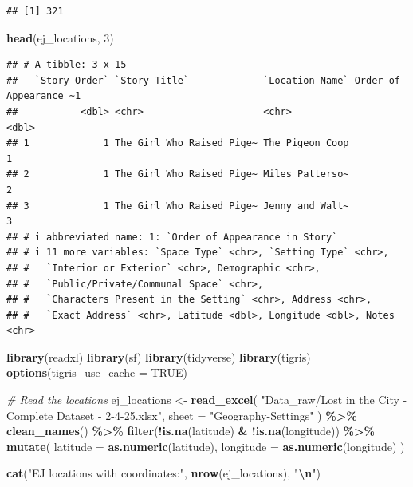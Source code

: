 \documentclass[
]{article}
\newenvironment{Shaded}{\begin{snugshade}}{\end{snugshade}}
\newcommand{\AttributeTok}[1]{\textcolor[rgb]{0.13,0.29,0.53}{#1}}
\newcommand{\CommentTok}[1]{\textcolor[rgb]{0.56,0.35,0.01}{\textit{#1}}}
\newcommand{\ConstantTok}[1]{\textcolor[rgb]{0.56,0.35,0.01}{#1}}
\newcommand{\DecValTok}[1]{\textcolor[rgb]{0.00,0.00,0.81}{#1}}
\newcommand{\FunctionTok}[1]{\textcolor[rgb]{0.13,0.29,0.53}{\textbf{#1}}}
\newcommand{\NormalTok}[1]{#1}
\newcommand{\OtherTok}[1]{\textcolor[rgb]{0.56,0.35,0.01}{#1}}
\newcommand{\SpecialCharTok}[1]{\textcolor[rgb]{0.81,0.36,0.00}{\textbf{#1}}}
\newcommand{\StringTok}[1]{\textcolor[rgb]{0.31,0.60,0.02}{#1}}
\begin{document}
\begin{verbatim}
## [1] 321
\end{verbatim}

\begin{Shaded}
\begin{Highlighting}[]
\FunctionTok{head}\NormalTok{(ej\_locations, }\DecValTok{3}\NormalTok{)}
\end{Highlighting}
\end{Shaded}

\begin{verbatim}
## # A tibble: 3 x 15
##   `Story Order` `Story Title`             `Location Name` Order of Appearance ~1
##           <dbl> <chr>                     <chr>                            <dbl>
## 1             1 The Girl Who Raised Pige~ The Pigeon Coop                      1
## 2             1 The Girl Who Raised Pige~ Miles Patterso~                      2
## 3             1 The Girl Who Raised Pige~ Jenny and Walt~                      3
## # i abbreviated name: 1: `Order of Appearance in Story`
## # i 11 more variables: `Space Type` <chr>, `Setting Type` <chr>,
## #   `Interior or Exterior` <chr>, Demographic <chr>,
## #   `Public/Private/Communal Space` <chr>,
## #   `Characters Present in the Setting` <chr>, Address <chr>,
## #   `Exact Address` <chr>, Latitude <dbl>, Longitude <dbl>, Notes <chr>
\end{verbatim}

\begin{Shaded}
\begin{Highlighting}[]
\FunctionTok{library}\NormalTok{(readxl)}
\FunctionTok{library}\NormalTok{(sf)}
\FunctionTok{library}\NormalTok{(tidyverse)}
\FunctionTok{library}\NormalTok{(tigris)}
\FunctionTok{options}\NormalTok{(}\AttributeTok{tigris\_use\_cache =} \ConstantTok{TRUE}\NormalTok{)}

\CommentTok{\# Read the locations}
\NormalTok{ej\_locations }\OtherTok{\textless{}{-}} \FunctionTok{read\_excel}\NormalTok{(}
  \StringTok{"Data\_raw/Lost in the City {-} Complete Dataset {-} 2{-}4{-}25.xlsx"}\NormalTok{,}
  \AttributeTok{sheet =} \StringTok{"Geography{-}Settings"}
\NormalTok{) }\SpecialCharTok{\%\textgreater{}\%}
  \FunctionTok{clean\_names}\NormalTok{() }\SpecialCharTok{\%\textgreater{}\%}
  \FunctionTok{filter}\NormalTok{(}\SpecialCharTok{!}\FunctionTok{is.na}\NormalTok{(latitude) }\SpecialCharTok{\&} \SpecialCharTok{!}\FunctionTok{is.na}\NormalTok{(longitude)) }\SpecialCharTok{\%\textgreater{}\%}
  \FunctionTok{mutate}\NormalTok{(}
    \AttributeTok{latitude =} \FunctionTok{as.numeric}\NormalTok{(latitude),}
    \AttributeTok{longitude =} \FunctionTok{as.numeric}\NormalTok{(longitude)}
\NormalTok{  )}

\FunctionTok{cat}\NormalTok{(}\StringTok{"EJ locations with coordinates:"}\NormalTok{, }\FunctionTok{nrow}\NormalTok{(ej\_locations), }\StringTok{"}\SpecialCharTok{\textbackslash{}n}\StringTok{"}\NormalTok{)}
\end{Highlighting}
\end{Shaded}
\end{document}
